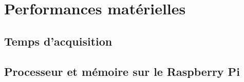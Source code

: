 
\section{Performances matérielles}


\subsection{Temps d'acquisition}

\subsection{Processeur et mémoire sur le Raspberry Pi}
